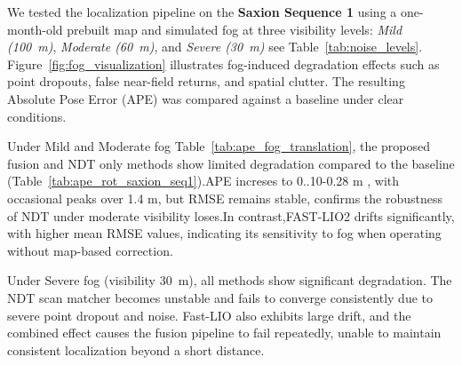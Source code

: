 We tested the localization pipeline on the \textbf{Saxion Sequence 1} using a one-month-old prebuilt map and simulated fog at three visibility levels: \textit{Mild (100~m)}, \textit{Moderate (60~m)}, and \textit{Severe (30~m)} see Table~\ref{tab:noise_levels}. Figure~\ref{fig:fog_visualization} illustrates fog-induced degradation effects such as point dropouts, false near-field returns, and spatial clutter. The resulting {Absolute Pose Error (APE)} was compared against a baseline under clear conditions.


Under Mild and Moderate fog Table~\ref{tab:ape_fog_translation}, the proposed fusion and NDT only methods show limited degradation compared to the baseline (Table~\ref{tab:ape_rot_saxion_seq1}).APE increses to 0..10-0.28 m , with occasional peaks over 1.4 m, but RMSE remains stable, confirms the robustness of NDT under moderate visibility loses.In contrast,FAST-LIO2 drifts significantly, with higher mean RMSE values, indicating its sensitivity to fog when operating without map-based correction.

Under Severe fog (visibility 30~m), all methods show significant degradation. The {NDT scan matcher becomes unstable} and fails to converge consistently due to severe point dropout and noise. {Fast-LIO also exhibits large drift}, and the combined effect causes the {fusion pipeline to fail repeatedly}, unable to maintain consistent localization beyond a short distance.
 
